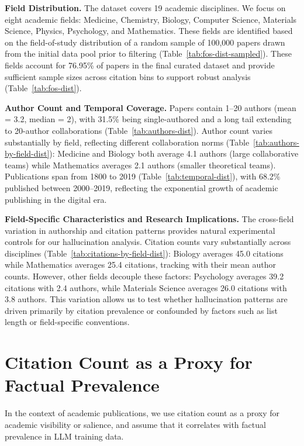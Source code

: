 \documentclass[11pt]{article}
\begin{document}
\textbf{Field Distribution.} The dataset covers 19 academic disciplines.
We focus on eight academic fields: Medicine, Chemistry, Biology, Computer Science, Materials Science, Physics, Psychology, and Mathematics. These fields are identified based on the field-of-study distribution of a random sample of 100,000 papers drawn from the initial data pool prior to filtering (Table~\ref{tab:fos-dist-sampled}). These fields account for 76.95\% of papers in the final curated dataset and provide sufficient sample sizes across citation bins to support robust analysis (Table~\ref{tab:fos-dist}).

\textbf{Author Count and Temporal Coverage.} Papers contain 1--20 authors (mean = 3.2, median = 2), with 31.5\% being single-authored and a long tail extending to 20-author collaborations
(Table~\ref{tab:authors-dist}).
Author count varies substantially by field, reflecting different collaboration norms (Table~\ref{tab:authors-by-field-dist}): Medicine and Biology both average 4.1 authors (large collaborative teams) while Mathematics averages 2.1 authors (smaller theoretical teams). Publications span from 1800 to 2019 (Table~\ref{tab:temporal-dist}), with 68.2\% published between 2000--2019, reflecting the exponential growth of academic publishing in the digital era.

\textbf{Field-Specific Characteristics and Research Implications.} The cross-field variation in authorship and citation patterns provides natural experimental controls for our hallucination analysis. Citation counts vary substantially across disciplines (Table~\ref{tab:citations-by-field-dist}): Biology averages 45.0 citations while Mathematics averages 25.4 citations, tracking with their mean author counts. However, other fields decouple these factors: Psychology averages 39.2 citations with 2.4 authors, while Materials Science averages 26.0 citations with 3.8 authors. This variation allows us to test whether hallucination patterns are driven primarily by citation prevalence or confounded by factors such as list length or field-specific conventions.

\section{Citation Count as a Proxy for Factual Prevalence}

In the context of academic publications, we use citation count as a proxy for academic visibility or salience, and assume that it correlates with factual prevalence in LLM training data.
\end{document}
